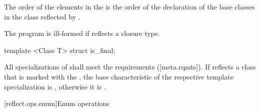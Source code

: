 \begin{std.txt}
\begin{itemdescr}
\pnum
The order of the elements in the  is the order of the declaration of the base classes in the class reflected by .

\pnum
\remarks
The program is ill-formed if  reflects a closure type.
\end{itemdescr}

\begin{itemdecl}
template <Class T> struct is_final;
\end{itemdecl}

\begin{itemdescr}
\pnum
All specializations of  shall meet the  requirements ([meta.rqmts]). If  reflects a class that is marked with the  , the base characteristic of the respective template specialization is , otherwise it is .
\end{itemdescr}

\end{std.txt}

[reflect.ops.enum]{Enum operations}

